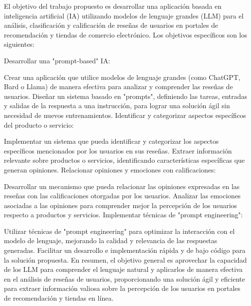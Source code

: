 
El objetivo del trabajo propuesto es desarrollar una aplicación 
basada en inteligencia artificial (IA) utilizando modelos de lenguaje grandes (LLM) 
para el análisis, clasificación y calificación de reseñas de usuarios en portales 
de recomendación y tiendas de comercio electrónico. 
Los objetivos específicos son los siguientes:

Desarrollar una "prompt-based" IA:

Crear una aplicación que utilice modelos de lenguaje grandes (como ChatGPT, Bard o Llama) 
de manera efectiva para analizar y comprender las reseñas de usuarios.
Diseñar un sistema basado en "prompts", definiendo las tareas, entradas y 
salidas de la respuesta a una instrucción, para lograr una solución 
ágil sin necesidad de nuevos entrenamientos.
Identificar y categorizar aspectos específicos del producto o servicio:

Implementar un sistema que pueda identificar y categorizar 
los aspectos específicos mencionados por los usuarios en sus reseñas.
Extraer información relevante sobre productos o servicios, 
identificando características específicas que generan opiniones.
Relacionar opiniones y emociones con calificaciones:

Desarrollar un mecanismo que pueda relacionar las opiniones expresadas 
en las reseñas con las calificaciones otorgadas por los usuarios.
Analizar las emociones asociadas a las opiniones para comprender 
mejor la percepción de los usuarios respecto a productos y servicios.
Implementar técnicas de "prompt engineering":

Utilizar técnicas de "prompt engineering" para optimizar la 
interacción con el modelo de lenguaje, mejorando la calidad y 
relevancia de las respuestas generadas.
Facilitar un desarrollo e implementación rápida y de bajo código para la solución propuesta.
En resumen, el objetivo general es aprovechar la capacidad de los LLM 
para comprender el lenguaje natural y aplicarlos de manera efectiva en el 
análisis de reseñas de usuarios, proporcionando una solución ágil y 
eficiente para extraer información valiosa sobre la 
percepción de los usuarios en portales de recomendación y tiendas en línea.